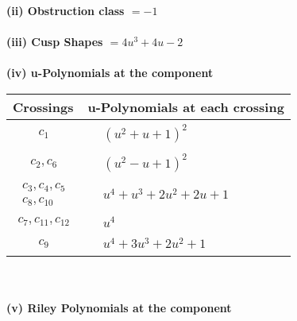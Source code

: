 \documentclass[1p]{elsarticle_modified}
\theoremstyle{definition}
\begin{document}
\flushleft \textbf{(ii) Obstruction class $= -1$}\\~\\
\flushleft \textbf{(iii) Cusp Shapes $= 4 u^3+4 u-2$}\\~\\
\newpage\renewcommand{\arraystretch}{1}
\flushleft \textbf{(iv) u-Polynomials at the component}\newline \\
\begin{tabular}{m{50pt}|m{274pt}}
Crossings & \hspace{64pt}u-Polynomials at each crossing \\
\hline $$\begin{aligned}c_{1}\end{aligned}$$&$\begin{aligned}
&(u^2+u+1)^2
\end{aligned}$\\
\hline $$\begin{aligned}c_{2},c_{6}\end{aligned}$$&$\begin{aligned}
&(u^2- u+1)^2
\end{aligned}$\\
\hline $$\begin{aligned}c_{3},c_{4},c_{5}\\c_{8},c_{10}\end{aligned}$$&$\begin{aligned}
&u^4+u^3+2 u^2+2 u+1
\end{aligned}$\\
\hline $$\begin{aligned}c_{7},c_{11},c_{12}\end{aligned}$$&$\begin{aligned}
&u^4
\end{aligned}$\\
\hline $$\begin{aligned}c_{9}\end{aligned}$$&$\begin{aligned}
&u^4+3 u^3+2 u^2+1
\end{aligned}$\\
\hline
\end{tabular}\\~\\
\newpage\renewcommand{\arraystretch}{1}
\flushleft \textbf{(v) Riley Polynomials at the component}\newline \\
\end{document}
